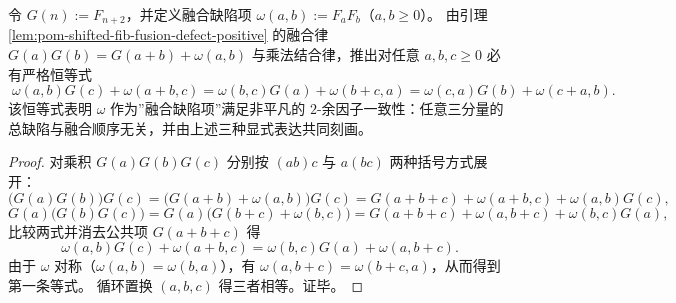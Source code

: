 \begin{proposition}\label{prop:pom-fusion-defect-2cocycle-identity}
令 \(G(n):=F_{n+2}\)，并定义融合缺陷项
\(
\omega(a,b):=F_aF_b
\)（\(a,b\ge 0\)）。
由引理 \ref{lem:pom-shifted-fib-fusion-defect-positive} 的融合律
\(
G(a)G(b)=G(a+b)+\omega(a,b)
\)
与乘法结合律，推出对任意 \(a,b,c\ge 0\) 必有严格恒等式
\[
\boxed{\;
\omega(a,b)G(c)+\omega(a+b,c)
=\omega(b,c)G(a)+\omega(b+c,a)
=\omega(c,a)G(b)+\omega(c+a,b).\;}
\]
该恒等式表明 \(\omega\) 作为”融合缺陷项”满足非平凡的 \(2\)-余因子一致性：任意三分量的总缺陷与融合顺序无关，并由上述三种显式表达共同刻画。
\end{proposition}
\begin{proof}
对乘积 \(G(a)G(b)G(c)\) 分别按 \((ab)c\) 与 \(a(bc)\) 两种括号方式展开：
\[
\bigl(G(a)G(b)\bigr)G(c)=\bigl(G(a+b)+\omega(a,b)\bigr)G(c)=G(a+b+c)+\omega(a+b,c)+\omega(a,b)G(c),
\]
\[
G(a)\bigl(G(b)G(c)\bigr)=G(a)\bigl(G(b+c)+\omega(b,c)\bigr)=G(a+b+c)+\omega(a,b+c)+\omega(b,c)G(a),
\]
比较两式并消去公共项 \(G(a+b+c)\) 得
\[
\omega(a,b)G(c)+\omega(a+b,c)
=\omega(b,c)G(a)+\omega(a,b+c).
\]
由于 \(\omega\) 对称（\(\omega(a,b)=\omega(b,a)\)），有 \(\omega(a,b+c)=\omega(b+c,a)\)，从而得到第一条等式。
循环置换 \((a,b,c)\) 得三者相等。证毕。
\end{proof}

\endinput
